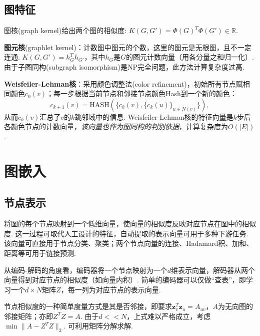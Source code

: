 \subsection{图特征}
\par 图核(graph kernel)给出两个图的相似度: $K(G,G')=\Phi(G)^T \Phi(G')\in \mathbb{R}$.
\par \textbf{图元核}(graphlet kernel)：计数图中图元的个数，这里的图元是无根图，且不一定连通. $K(G,G')=h_G^T h_{G'}$，其中$h_G$是$G$的图元计数向量（用各分量之和归一化）. 由于子图同构(subgraph isomorphism)是NP完全问题，此方法计算复杂度过高. 

\par \textbf{Weisfeiler-Lehman核}：采用颜色调整法(color refinement)，初始所有节点赋相同颜色$c_0(v)$；每一步根据当前节点和邻接节点颜色Hash到一个新的颜色：
\begin{equation}
    c_{k+1}(v)=\text{HASH}(\{c_k(v),\{c_k(u)\}_{u\in N(v)}\}),
\end{equation}
从而$c_k(v)$汇总了$v$的$k$跳邻域中的信息. Weisfeiler-Lehman核的特征向量是$k$步后各颜色节点的计数向量，\emph{该向量也作为图同构的判别依据}，计算复杂度为$O(\vert E \vert)$.

\section{图嵌入}

\subsection{节点表示}
\par 将图的每个节点映射到一个低维向量，使向量的相似度反映对应节点在图中的相似度. 这一过程可取代人工设计的特征，自动提取的表示向量可用于多种下游任务. 该向量可直接用于节点分类、聚类；两个节点向量的连接、Hadamard积、加和、距离等可用于链接预测. 

\par 从编码-解码的角度看，编码器将一个节点映射为一个$d$维表示向量，解码器从两个向量得到对应节点的相似度（如向量内积）. 简单的编码器可以仅做“查表”，即学习一个$d\times N$矩阵$Z$，每一列为对应节点的表示向量. 

\par 节点相似度的一种简单度量方式是其是否邻接，即要求$\mathbf{z}_v^T\mathbf{z}_u=A_{uv}$，$A$为无向图的邻接矩阵；亦即$Z^T Z=A$. 由于$d<<N$，上式难以严格成立，考虑$\min \|A-Z^T Z\|_2$. 可利用矩阵分解求解. 

